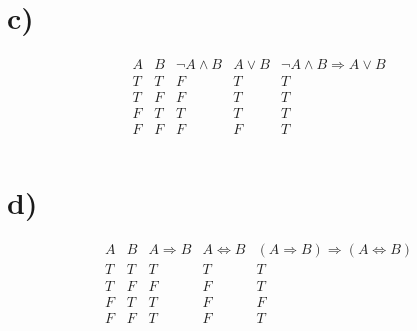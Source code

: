 \documentclass{article}
\begin{document}
\section*{c)}
\begin{displaymath}
\begin{array}{|c|c|c|c|c|c}

A & 
B & 
\neg A \wedge B & 
A \vee B & \neg A \wedge B \Rightarrow A \vee B\\ %
\hline  %
T & T & F & T & T\\
T & F & F & T & T\\
F & T & T & T & T\\
F & F & F & F & T\\

\end{array}
\end{displaymath}


\section*{d)}
\begin{displaymath}
\begin{array}{|c|c|c|c|c|c}

A & 
B & 
A \Rightarrow B & 
A \Leftrightarrow B & 
(A \Rightarrow B) \Rightarrow (A \Leftrightarrow B)\\ %
\hline  %
T & T & T & T & T\\
T & F & F & F & T\\
F & T & T & F & F\\
F & F & T & F & T\\

\end{array}
\end{displaymath}
\end{document}
